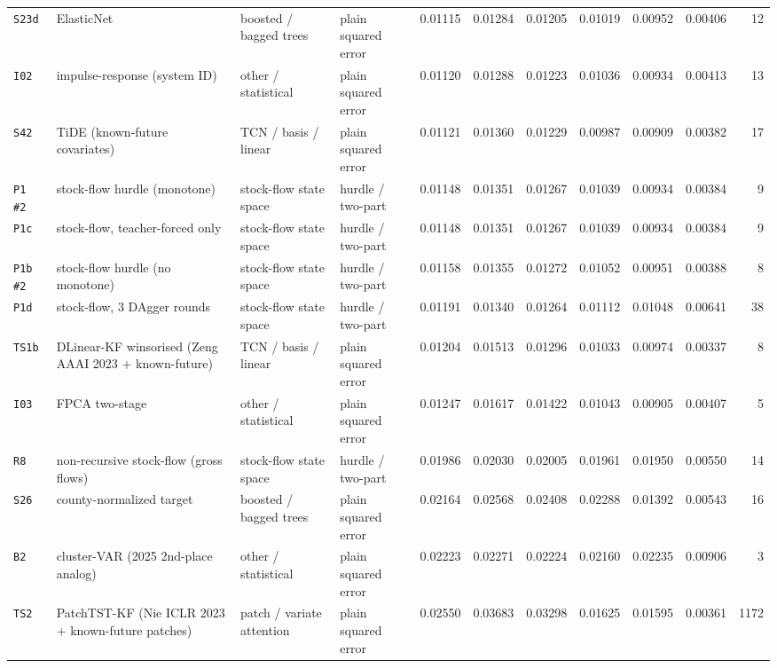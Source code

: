 \documentclass[9pt,landscape]{article}
\begin{document}
\begin{longtable}{@{}p{1.1cm}p{5.4cm}p{3.1cm}p{2.7cm}rrrrrrr@{}}
\texttt{S23d} & ElasticNet & boosted / bagged trees & plain squared error & 0.01115 & 0.01284 & 0.01205 & 0.01019 & 0.00952 & 0.00406 & 12 \\
\texttt{I02} & impulse-response (system ID) & other / statistical & plain squared error & 0.01120 & 0.01288 & 0.01223 & 0.01036 & 0.00934 & 0.00413 & 13 \\
\texttt{S42} & TiDE (known-future covariates) & TCN / basis / linear & plain squared error & 0.01121 & 0.01360 & 0.01229 & 0.00987 & 0.00909 & 0.00382 & 17 \\
\texttt{P1 \#2} & stock-flow hurdle (monotone) & stock-flow state space & hurdle / two-part & 0.01148 & 0.01351 & 0.01267 & 0.01039 & 0.00934 & 0.00384 & 9 \\
\rowcolor{gray!15}\texttt{P1c} & stock-flow, teacher-forced only & stock-flow state space & hurdle / two-part & 0.01148 & 0.01351 & 0.01267 & 0.01039 & 0.00934 & 0.00384 & 9 \\
\texttt{P1b \#2} & stock-flow hurdle (no monotone) & stock-flow state space & hurdle / two-part & 0.01158 & 0.01355 & 0.01272 & 0.01052 & 0.00951 & 0.00388 & 8 \\
\texttt{P1d} & stock-flow, 3 DAgger rounds & stock-flow state space & hurdle / two-part & 0.01191 & 0.01340 & 0.01264 & 0.01112 & 0.01048 & 0.00641 & 38 \\
\texttt{TS1b} & DLinear-KF winsorised (Zeng AAAI 2023 + known-future) & TCN / basis / linear & plain squared error & 0.01204 & 0.01513 & 0.01296 & 0.01033 & 0.00974 & 0.00337 & 8 \\
\texttt{I03} & FPCA two-stage & other / statistical & plain squared error & 0.01247 & 0.01617 & 0.01422 & 0.01043 & 0.00905 & 0.00407 & 5 \\
\texttt{R8} & non-recursive stock-flow (gross flows) & stock-flow state space & hurdle / two-part & 0.01986 & 0.02030 & 0.02005 & 0.01961 & 0.01950 & 0.00550 & 14 \\
\texttt{S26} & county-normalized target & boosted / bagged trees & plain squared error & 0.02164 & 0.02568 & 0.02408 & 0.02288 & 0.01392 & 0.00543 & 16 \\
\texttt{B2} & cluster-VAR (2025 2nd-place analog) & other / statistical & plain squared error & 0.02223 & 0.02271 & 0.02224 & 0.02160 & 0.02235 & 0.00906 & 3 \\
\texttt{TS2} & PatchTST-KF (Nie ICLR 2023 + known-future patches) & patch / variate attention & plain squared error & 0.02550 & 0.03683 & 0.03298 & 0.01625 & 0.01595 & 0.00361 & 1172 \\

\end{longtable}
\end{document}
